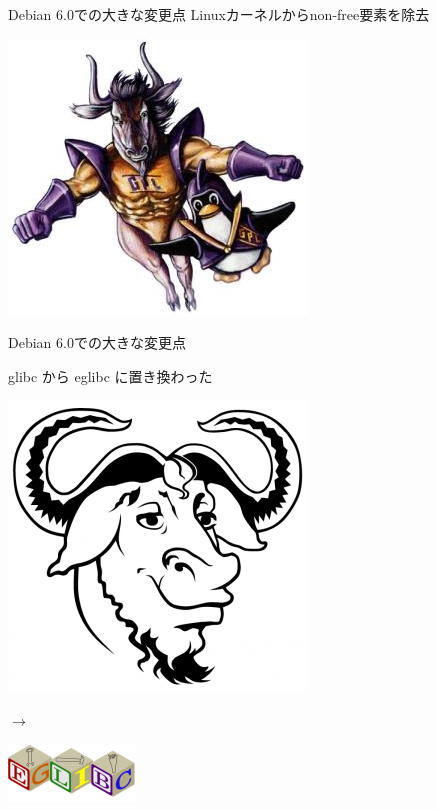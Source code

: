 \begin{frame}{Debian 6.0での大きな変更点}
\large Linuxカーネルからnon-free要素を除去
\begin{center}
\includegraphics[width=0.7\vsize]{image201103/gnu-linux.jpg}
\end{center}
\end{frame}


\begin{frame}{Debian 6.0での大きな変更点}
\begin{center}
\large glibc から eglibc に置き換わった
\end{center}
\begin{minipage}[t]{0.45\hsize}
\includegraphics[width=0.4\vsize]{image201103/gnu.png} 
\end{minipage}
\Huge $\rightarrow$
\begin{minipage}[t]{0.40\hsize}
\includegraphics[width=0.40\vsize]{image201103/eglibc-logo.png} 
\end{minipage}
\end{frame}


